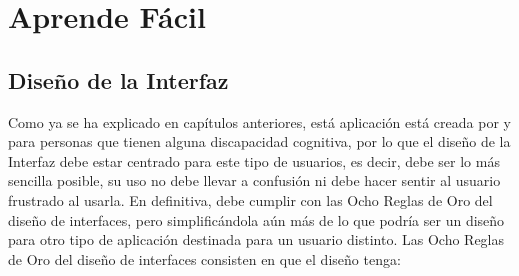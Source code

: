 \chapter{Aprende Fácil}
\label{cap:aprendeFacil}




\section{Diseño de la Interfaz}
\label{cap:sec:disenioInterfaz}
Como ya se ha explicado en capítulos anteriores, está aplicación está creada por y para personas que tienen alguna discapacidad cognitiva, por lo que el diseño de la Interfaz debe estar centrado para este tipo de usuarios, es decir, debe ser lo más sencilla posible, su uso no debe llevar a confusión ni debe hacer sentir al usuario frustrado al usarla. En definitiva, debe cumplir con las Ocho Reglas de Oro del diseño de interfaces, pero simplificándola aún más de lo que podría ser un diseño para otro tipo de aplicación destinada para un usuario distinto. 
Las Ocho Reglas de Oro del diseño de interfaces consisten en que el diseño tenga:
